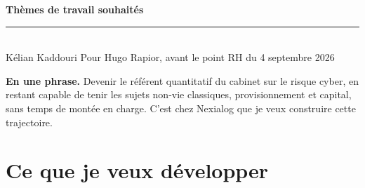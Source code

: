 \documentclass[11pt,a4paper]{article}
\begin{document}
\small

{\Large\bfseries\color{bleu} Thèmes de travail souhaités}\\[3pt]
{\color{accent}\rule{\textwidth}{1.1pt}}\\[3pt]
{\footnotesize Kélian Kaddouri \hfill Pour Hugo Rapior, avant le point RH du 4 septembre
2026}

\vspace{5pt}

\noindent\textbf{En une phrase.} Devenir le référent quantitatif du cabinet sur le risque
cyber, en restant capable de tenir les sujets non-vie classiques, provisionnement et capital,
sans temps de montée en charge. C'est chez Nexialog que je veux construire cette trajectoire.

\section{Ce que je veux développer}
\end{document}
